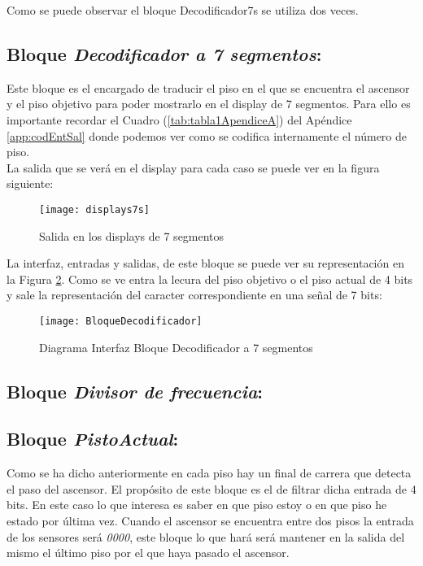 	Como se puede observar el bloque Decodificador7s se utiliza dos veces. \\ 


\subsection{Bloque \textit{Decodificador a 7 segmentos}:} \label{bloque:Decodificador7s}
    Este bloque es el encargado de traducir el piso en el que se encuentra el ascensor y el piso objetivo para poder mostrarlo en el display de 7 segmentos. Para ello es importante recordar el Cuadro (\ref{tab:tabla1ApendiceA}) del Apéndice \ref{app:codEntSal} donde podemos ver como se codifica internamente el número de piso. \\ 
    
    La salida que se verá en el display para cada caso se puede ver en la figura siguiente:
    
    \begin{figure}[H]
		    \centering
		    \texttt{[image: displays7s]}
		    \caption{Salida en los displays de 7 segmentos}
		    \label{fig:displays7s}
	\end{figure}
    
    La interfaz, entradas y salidas, de este bloque se puede ver su representación en la Figura \ref{fig:BloqueDecodificador7seg}. Como se ve entra la lecura del piso objetivo o el piso actual de 4 bits y sale la representación del caracter correspondiente en una señal de 7 bits:
    
    \begin{figure}[H]
		    \centering
		    \texttt{[image: BloqueDecodificador]}
		    \caption{Diagrama Interfaz Bloque Decodificador a 7 segmentos}
		    \label{fig:BloqueDecodificador7seg}
	\end{figure}
\subsection{Bloque \textit{Divisor de frecuencia}:} \label{bloque:DivisorFrecuencia}

\subsection{Bloque \textit{PistoActual}:} \label{bloque:PisoActual}
    Como se ha dicho anteriormente en cada piso hay un final de carrera que detecta el paso del ascensor. El propósito de este bloque es el de filtrar dicha entrada de 4 bits. En este caso lo que interesa es saber en que piso estoy o en que piso he estado por última vez. Cuando el ascensor se encuentra entre dos pisos la entrada de los sensores será \textit{0000}, este bloque lo que hará será mantener en la salida del mismo el último piso por el que haya pasado el ascensor. \\ 
    
